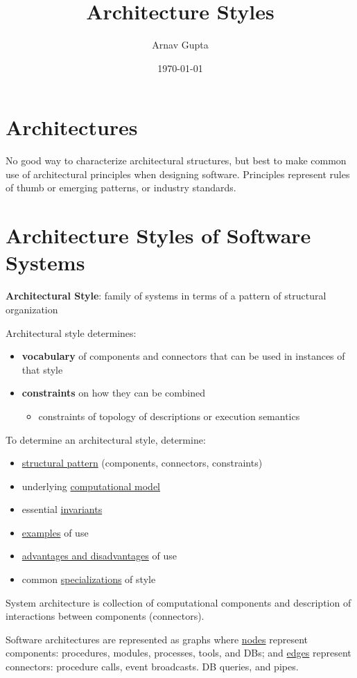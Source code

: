 \documentclass[11pt]{article}
\author{Arnav Gupta}
\date{\today}
\title{Architecture Styles}
\begin{document}
\maketitle
\tableofcontents

\section{Architectures}
\label{sec:org43d23dd}
No good way to characterize architectural structures, but best to make common use of architectural
principles when designing software.
Principles represent rules of thumb or emerging patterns, or industry standards.
\section{Architecture Styles of Software Systems}
\label{sec:orgc1a829f}
\textbf{Architectural Style}: family of systems in terms of a pattern of structural organization

Architectural style determines:
\begin{itemize}
\item \textbf{vocabulary} of components and connectors that can be used in instances of that style
\item \textbf{constraints} on how they can be combined
\begin{itemize}
\item constraints of topology of descriptions or execution semantics
\end{itemize}
\end{itemize}

To determine an architectural style, determine:
\begin{itemize}
\item \uline{structural pattern} (components, connectors, constraints)
\item underlying \uline{computational model}
\item essential \uline{invariants}
\item \uline{examples} of use
\item \uline{advantages and disadvantages} of use
\item common \uline{specializations} of style
\end{itemize}

System architecture is collection of computational components and description of interactions between
components (connectors).

Software architectures are represented as graphs where \uline{nodes} represent components: procedures, modules,
processes, tools, and DBs; and \uline{edges} represent connectors: procedure calls, event broadcasts.
DB queries, and pipes.
\end{document}
